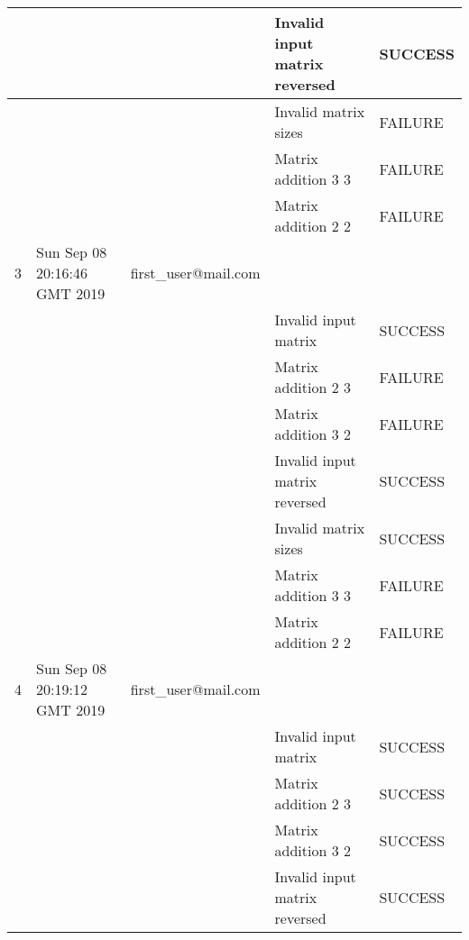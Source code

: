 \begin{center}
\begin{longtable}{|l|l|l|l|l|}
    &                              &                                 & Invalid input matrix reversed & SUCCESS \\ \hline
    &                              &                                 & Invalid matrix sizes          & FAILURE \\ \hline
    &                              &                                 & Matrix addition 3 3           & FAILURE \\ \hline
    &                              &                                 & Matrix addition 2 2           & FAILURE \\ \hline
    3     & Sun Sep 08 20:16:46 GMT 2019 & first\_user@mail.com &                               &         \\ \hline
    &                              &                                 & Invalid input matrix          & SUCCESS \\ \hline
    &                              &                                 & Matrix addition 2 3           & FAILURE \\ \hline
    &                              &                                 & Matrix addition 3 2           & FAILURE \\ \hline
    &                              &                                 & Invalid input matrix reversed & SUCCESS \\ \hline
    &                              &                                 & Invalid matrix sizes          & SUCCESS \\ \hline
    &                              &                                 & Matrix addition 3 3           & FAILURE \\ \hline
    &                              &                                 & Matrix addition 2 2           & FAILURE \\ \hline
    4     & Sun Sep 08 20:19:12 GMT 2019 & first\_user@mail.com &                               &         \\ \hline
    &                              &                                 & Invalid input matrix          & SUCCESS \\ \hline
    &                              &                                 & Matrix addition 2 3           & SUCCESS \\ \hline
    &                              &                                 & Matrix addition 3 2           & SUCCESS \\ \hline
    &                              &                                 & Invalid input matrix reversed & SUCCESS \\ \hline

\end{longtable}
\end{center}
